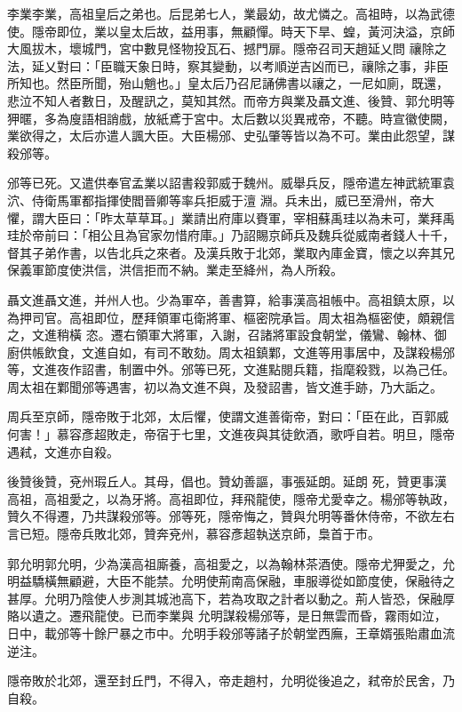 \begin{pinyinscope}
 李業李業，高祖皇后之弟也。后昆弟七人，業最幼，故尤憐之。高祖時，以為武德使。隱帝即位，業以皇太后故，益用事，無顧憚。時天下旱、蝗，黃河決溢，京師大風拔木，壞城門，宮中數見怪物投瓦石、撼門扉。隱帝召司天趙延乂問
 禳除之法，延乂對曰：「臣職天象日時，察其變動，以考順逆吉凶而已，禳除之事，非臣所知也。然臣所聞，殆山魈也。」皇太后乃召尼誦佛書以禳之，一尼如廁，既還，悲泣不知人者數日，及醒訊之，莫知其然。而帝方與業及聶文進、後贊、郭允明等狎暱，多為廋語相誚戲，放紙鳶于宮中。太后數以災異戒帝，不聽。時宣徽使闕，業欲得之，太后亦遣人諷大臣。大臣楊邠、史弘肇等皆以為不可。業由此怨望，謀殺邠等。



 邠等已死。又遣供奉官孟業以詔書殺郭威于魏州。威舉兵反，隱帝遣左神武統軍袁泬、侍衛馬軍都指揮使閻晉卿等率兵拒威于澶
 淵。兵未出，威已至滑州，帝大懼，謂大臣曰：「昨太草草耳。」業請出府庫以賚軍，宰相蘇禹珪以為未可，業拜禹珪於帝前曰：「相公且為官家勿惜府庫。」乃詔賜京師兵及魏兵從威南者錢人十千，督其子弟作書，以告北兵之來者。及漢兵敗于北郊，業取內庫金寶，懷之以奔其兄保義軍節度使洪信，洪信拒而不納。業走至絳州，為人所殺。



 聶文進聶文進，并州人也。少為軍卒，善書算，給事漢高祖帳中。高祖鎮太原，以為押司官。高祖即位，歷拜領軍屯衛將軍、樞密院承旨。周太祖為樞密使，頗親信之，文進稍橫
 恣。遷右領軍大將軍，入謝，召諸將軍設食朝堂，儀鸞、翰林、御廚供帳飲食，文進自如，有司不敢劾。周太祖鎮鄴，文進等用事居中，及謀殺楊邠等，文進夜作詔書，制置中外。邠等已死，文進點閱兵籍，指麾殺戮，以為己任。周太祖在鄴聞邠等遇害，初以為文進不與，及發詔書，皆文進手跡，乃大詬之。



 周兵至京師，隱帝敗于北郊，太后懼，使謂文進善衛帝，對曰：「臣在此，百郭威何害！」慕容彥超敗走，帝宿于七里，文進夜與其徒飲酒，歌呼自若。明旦，隱帝遇弒，文進亦自殺。



 後贊後贊，兗州瑕丘人。其母，倡也。贊幼善謳，事張延朗。延朗
 死，贊更事漢高祖，高祖愛之，以為牙將。高祖即位，拜飛龍使，隱帝尤愛幸之。楊邠等執政，贊久不得遷，乃共謀殺邠等。邠等死，隱帝悔之，贊與允明等番休侍帝，不欲左右言已短。隱帝兵敗北郊，贊奔兗州，慕容彥超執送京師，梟首于市。



 郭允明郭允明，少為漢高祖廝養，高祖愛之，以為翰林茶酒使。隱帝尤狎愛之，允明益驕橫無顧避，大臣不能禁。允明使荊南高保融，車服導從如節度使，保融待之甚厚。允明乃陰使人步測其城池高下，若為攻取之計者以動之。荊人皆恐，保融厚賂以遺之。遷飛龍使。已而李業與
 允明謀殺楊邠等，是日無雲而昏，霧雨如泣，日中，載邠等十餘尸暴之市中。允明手殺邠等諸子於朝堂西廡，王章婿張貽肅血流逆注。



 隱帝敗於北郊，還至封丘門，不得入，帝走趙村，允明從後追之，弒帝於民舍，乃自殺。



\end{pinyinscope}